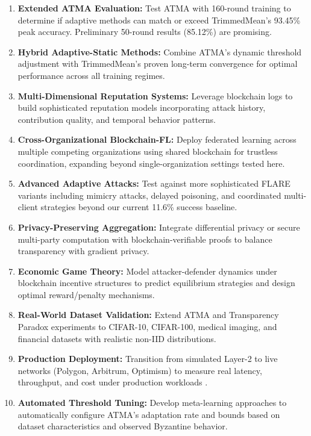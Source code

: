 \documentclass[12pt,a4paper,onecolumn]{article}
\begin{document}
\begin{enumerate}
    \item \textbf{Extended ATMA Evaluation:} Test ATMA with 160-round training to determine if adaptive methods can match or exceed TrimmedMean's 93.45\% peak accuracy. Preliminary 50-round results (85.12\%) are promising.
    
    \item \textbf{Hybrid Adaptive-Static Methods:} Combine ATMA's dynamic threshold adjustment with TrimmedMean's proven long-term convergence for optimal performance across all training regimes.
    
    \item \textbf{Multi-Dimensional Reputation Systems:} Leverage blockchain logs to build sophisticated reputation models incorporating attack history, contribution quality, and temporal behavior patterns.
    
    \item \textbf{Cross-Organizational Blockchain-FL:} Deploy federated learning across multiple competing organizations using shared blockchain for trustless coordination, expanding beyond single-organization settings tested here.
    
    \item \textbf{Advanced Adaptive Attacks:} Test against more sophisticated FLARE variants including mimicry attacks, delayed poisoning, and coordinated multi-client strategies beyond our current 11.6\% success baseline.
    
    \item \textbf{Privacy-Preserving Aggregation:} Integrate differential privacy or secure multi-party computation \cite{mugunthan2020smpcchain} with blockchain-verifiable proofs to balance transparency with gradient privacy.
    
    \item \textbf{Economic Game Theory:} Model attacker-defender dynamics under blockchain incentive structures to predict equilibrium strategies and design optimal reward/penalty mechanisms.
    
    \item \textbf{Real-World Dataset Validation:} Extend ATMA and Transparency Paradox experiments to CIFAR-10, CIFAR-100, medical imaging, and financial datasets with realistic non-IID distributions.
    
    \item \textbf{Production Deployment:} Transition from simulated Layer-2 to live networks (Polygon, Arbitrum, Optimism) to measure real latency, throughput, and cost under production workloads \cite{wu2024blockchain}.
    
    \item \textbf{Automated Threshold Tuning:} Develop meta-learning approaches to automatically configure ATMA's adaptation rate and bounds based on dataset characteristics and observed Byzantine behavior.
\end{enumerate}
\end{document}
